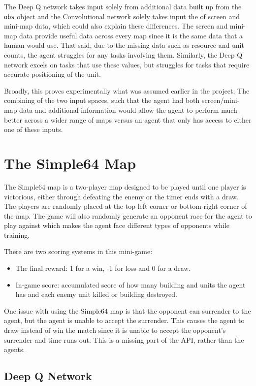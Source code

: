 The Deep Q network takes input solely from additional data built up from the
\texttt{obs} object and the Convolutional network solely takes input the of
screen and mini-map data, which could also explain these differences. The screen
and mini-map data provide useful data across every map since it is the same
data that a human would use. That said, due to the missing data such as resource
and unit counts, the agent struggles for any tasks involving them. Similarly,
the Deep Q network excels on tasks that use these values, but struggles for
tasks that require accurate positioning of the unit.

Broadly, this proves experimentally what was assumed earlier in the project;
The combining of the two input spaces, such that the agent had both
screen/mini-map data and additional information would allow the agent to perform
much better across a wider range of maps versus an agent that only has access to
either one of these inputs.

\section{The Simple64 Map}

The Simple64 map is a two-player map designed to be played until one player is
victorious, either through defeating the enemy or the timer ends with a draw.
The players are randomly placed at the top left corner or bottom right corner of
the map. The game will also randomly generate an opponent race for the agent to
play against which makes the agent face different types of opponents while
training.

There are two scoring systems in this mini-game:

\begin{itemize}
    \item The final reward: 1 for a win, -1 for loss and 0 for a draw.
    \item In-game score: accumulated score of how many building and units the
        agent has and each enemy unit killed or building destroyed.
\end{itemize}

One issue with using the Simple64 map is that the opponent can surrender to the
agent, but the agent is unable to accept the surrender. This causes the agent to
draw instead of win the match since it is unable to accept the opponent's
surrender and time runs out. This is a missing part of the API, rather than the
agents.

\subsection{Deep Q Network}

